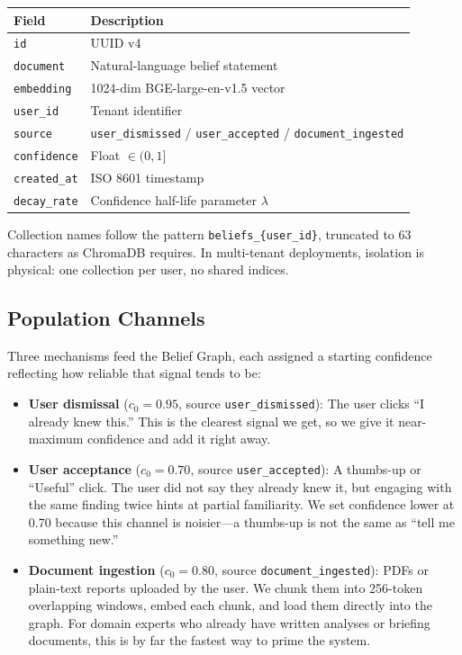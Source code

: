\documentclass[conference]{IEEEtran}
\begin{document}
\begin{center}
\footnotesize
\begin{tabular}{@{}lp{4.8cm}@{}}
  \toprule
  \textbf{Field}   & \textbf{Description} \\
  \midrule
  \texttt{id}         & UUID v4 \\
  \texttt{document}   & Natural-language belief statement \\
  \texttt{embedding}  & 1024-dim BGE-large-en-v1.5 vector \\
  \texttt{user\_id}   & Tenant identifier \\
  \texttt{source}     & \texttt{user\_dismissed} /
                        \texttt{user\_accepted} /
                        \texttt{document\_ingested} \\
  \texttt{confidence} & Float $\in (0, 1]$ \\
  \texttt{created\_at}& ISO 8601 timestamp \\
  \texttt{decay\_rate}& Confidence half-life parameter $\lambda$ \\
  \bottomrule
\end{tabular}
\end{center}

Collection names follow the pattern \texttt{beliefs\_\{user\_id\}},
truncated to 63 characters as ChromaDB requires. In multi-tenant
deployments, isolation is physical: one collection per user, no
shared indices.

\subsection{Population Channels}

Three mechanisms feed the Belief Graph, each assigned a starting
confidence reflecting how reliable that signal tends to be:

\begin{itemize}
  \item \textbf{User dismissal} ($c_0 = 0.95$, source
  \texttt{user\_dismissed}): The user clicks ``I already knew
  this.'' This is the clearest signal we get, so we give it
  near-maximum confidence and add it right away.

  \item \textbf{User acceptance} ($c_0 = 0.70$, source
  \texttt{user\_accepted}): A thumbs-up or ``Useful'' click.
  The user did not say they already knew it, but engaging with
  the same finding twice hints at partial familiarity. We set
  confidence lower at 0.70 because this channel is noisier---a
  thumbs-up is not the same as ``tell me something new.''

  \item \textbf{Document ingestion} ($c_0 = 0.80$, source
  \texttt{document\_ingested}): PDFs or plain-text reports
  uploaded by the user. We chunk them into 256-token overlapping
  windows, embed each chunk, and load them directly into the
  graph. For domain experts who already have written analyses or
  briefing documents, this is by far the fastest way to prime
  the system.
\end{itemize}
\end{document}
